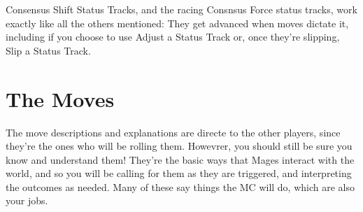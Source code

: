 \documentclass[
  oneside,
  statementpaper,
  9pt]{memoir}
\begin{document}
\begin{MC}

Consensus Shift Status Tracks, and the racing Consnsus Force status tracks, work exactly like all the others mentioned: They get advanced when moves dictate it, including if you choose to use Adjust a Status Track or, once they're slipping, Slip a Status Track.

\end{MC}

\newpage

\hypertarget{the-moves}{%
\chapter{The Moves}\label{the-moves}}

\begin{MC}

The move descriptions and explanations are directe to the other players, since they're the ones who will be rolling them. Howevrer, you should still be sure you know and understand them! They're the basic ways that Mages interact with the world, and so you will be calling for them as they are triggered, and interpreting the outcomes as needed. Many of these say things the MC will do, which are also your jobs.

\end{MC}
\end{document}

